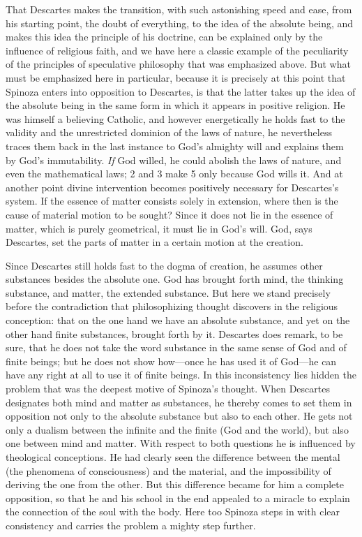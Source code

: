 \documentclass[12pt]{book}
\newcommand{\opage}[1]{\marginnote{\footnotesize\textit{[#1]}}}
\begin{document}
That Descartes makes the transition, with such astonishing speed and ease, from his
starting point, the doubt of everything, to the idea of the absolute being, and makes
this idea the principle of his doctrine, can be explained only by the influence of
religious faith, and we have here a classic example of the peculiarity of the
principles of speculative philosophy that was emphasized above. But what must be
emphasized here in particular, because it is precisely at this point that Spinoza
enters into opposition to Descartes, is that the latter takes up the idea of the
absolute being in the same form in which it appears in positive religion. He was
himself a believing Catholic, and however energetically he holds fast to the validity
and the unrestricted dominion of the laws of nature, he nevertheless traces them back
in the last instance to God's almighty will and \opage{17}explains them by God's
immutability. \emph{If} God willed, he could abolish the laws of nature, and even the
mathematical laws; 2 and 3 make 5 only because God wills it. And at another point
divine intervention becomes positively necessary for Descartes's system. If the
essence of matter consists solely in extension, where then is the cause of material
motion to be sought? Since it does not lie in the essence of matter, which is purely
geometrical, it must lie in God's will. God, says Descartes, set the parts of matter
in a certain motion at the creation.

Since Descartes still holds fast to the dogma of creation, he assumes other
substances besides the absolute one. God has brought forth mind, the thinking
substance, and matter, the extended substance. But here we stand precisely before the
contradiction that philosophizing thought discovers in the religious conception: that
on the one hand we have an absolute substance, and yet on the other hand finite
substances, brought forth by it. Descartes does remark, to be sure, that he does not
take the word substance in the same sense of God and of finite beings; but he does
not show how---once he has used it of God---he can have any right at all to use it of
finite beings. In this inconsistency lies hidden the problem that was the deepest
motive of Spinoza's thought. When Descartes designates both mind and matter as
substances, he thereby comes to set them in opposition not only to the absolute
substance but also to each other. He gets not only a dualism between the infinite and
the finite \opage{18}(God and the world), but also one between mind and matter. With
respect to both questions he is influenced by theological conceptions. He had clearly
seen the difference between the mental (the phenomena of consciousness) and the
material, and the impossibility of deriving the one from the other. But this
difference became for him a complete opposition, so that he and his school in the end
appealed to a miracle to explain the connection of the soul with the body. Here too
Spinoza steps in with clear consistency and carries the problem a mighty step further.
\end{document}

